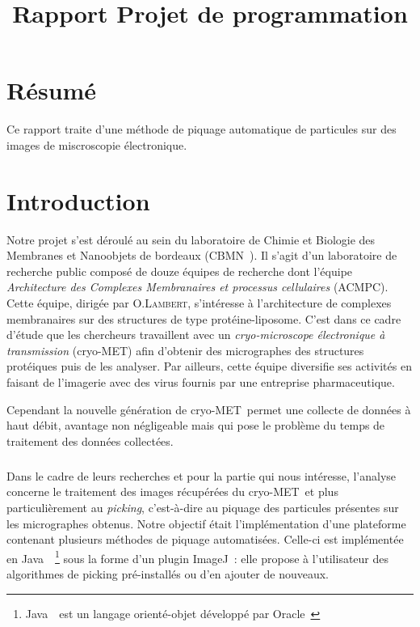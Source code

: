 \documentclass[11pt,a4paper]{report}
\title{Rapport Projet de programmation}
\begin{document}
\maketitle
\newcommand{\cme}{cryo-MET}
\newcommand{\java}{Java~{\tiny \texttrademark}}
\newcommand{\js}{JavaScript}
\newcommand{\imj}{ImageJ}



\chapter*{Résumé}
Ce rapport traite d'une méthode de piquage automatique de particules sur des images de miscroscopie électronique.
\tableofcontents
\chapter*{Introduction}
Notre projet s'est déroulé au sein du laboratoire de Chimie et Biologie des Membranes et Nanoobjets de bordeaux (CBMN~\cite{cbmn:url}).
Il s'agit d'un laboratoire de recherche public composé de douze équipes de recherche dont l'équipe \emph{Architecture des Complexes Membranaires et processus cellulaires} (ACMPC). %
Cette équipe, dirigée par O.\textsc{Lambert}, s'intéresse à l'architecture de complexes membranaires sur des structures de type protéine-liposome. C'est dans ce cadre d'étude que les chercheurs travaillent avec un \emph{cryo-microscope électronique à transmission} (\cme) afin d'obtenir des micrographes des structures protéiques puis de les analyser. Par ailleurs, cette équipe diversifie ses activités en faisant de l'imagerie avec des virus fournis par une entreprise pharmaceutique.

\noindent
Cependant la nouvelle génération de \cme ~permet une collecte de données à haut débit, avantage non négligeable mais qui pose le problème du temps de traitement des données collectées. %

\paragraph*{}
Dans le cadre de leurs recherches et pour la partie qui nous intéresse, l'analyse concerne le traitement des images récupérées du \cme\ et plus particulièrement au \emph{picking}, c'est-à-dire au piquage des particules présentes sur les micrographes obtenus. %
Notre objectif était l'implémentation d'une plateforme contenant plusieurs méthodes de piquage automatisées.
Celle-ci est implémentée en \java ~\footnote{\java\ est un langage orienté-objet développé par Oracle~\cite{java:url}} sous la forme d'un plugin \imj~\cite{imagej:url}: elle propose à l'utilisateur des algorithmes de picking pré-installés ou d'en ajouter de nouveaux.
\end{document}

